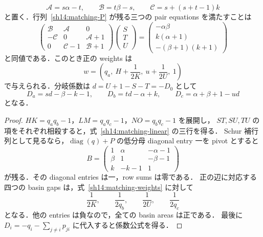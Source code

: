 \begin{proposition}
\label{sh14:linear-reduction}
\[
 \mathcal A=s\alpha-t,\qquad
 \mathcal B=t\beta-s,\qquad
 \mathcal C=s+(s+t-1)k
\]
と置く．行列~\eqref{sh14:matching-P} が残る三つの pair equations を満たすことは
\begin{equation}\label{sh14:matching-linear}
 \begin{pmatrix}
  \mathcal B&\mathcal A&0\\
  -\mathcal C&0&\mathcal A+1\\
  0&\mathcal C-1&\mathcal B+1
 \end{pmatrix}
 \begin{pmatrix}S\\T\\U\end{pmatrix}
 =\begin{pmatrix}
 -\alpha\beta\\k(\alpha+1)\\-(\beta+1)(k+1)
 \end{pmatrix}
\end{equation}
と同値である．このとき正の weights は
\begin{equation}\label{sh14:matching-weights}
 w=\left(q_a,\ H+\frac1{2K},\ u+\frac1{2U},\ 1\right)
\end{equation}
で与えられる．分岐係数は $d=U+1-S-T=-D_0$ として
\begin{equation}\label{sh14:matching-D}
 D_a=sd-\beta-k-1,\qquad
 D_b=td-\alpha+k,\qquad
 D_c=\alpha+\beta+1-ud
\end{equation}
となる．
\end{proposition}

\begin{proof}
$HK=q_aq_b-1$，$LM=q_aq_c-1$，$NO=q_bq_c-1$ を展開し，
$ST,SU,TU$ の項をそれぞれ相殺すると，式~\eqref{sh14:matching-linear} の三行を得る．
Schur 補行列として見るなら，$\operatorname{diag}(q)+P$ の低分母 diagonal entry 一を pivot とすると
\[
 B=\begin{pmatrix}
 1&\alpha&-\alpha-1\\
 \beta&1&-\beta-1\\
 k&-k-1&1
 \end{pmatrix}
\]
が残る．その diagonal entries は一，row sums は零である．
正の辺に対応する四つの basin gaps は，式~\eqref{sh14:matching-weights} に対して
\[
 \frac1{2K},\qquad \frac1{2q_b},\qquad
 \frac1{2U},\qquad \frac1{2q_c}
\]
となる．他の entries は負なので，全ての basin areas は正である．
最後に $D_i=-q_i-\sum_{j\ne i}p_{ji}$ に代入すると係数公式を得る．
\end{proof}

